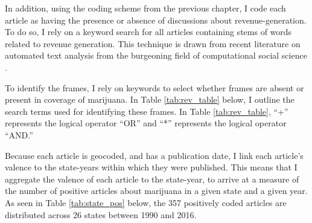 In addition, using the coding scheme from the previous chapter, I code each article as having the presence or absence of discussions about revenue-generation. To do so, I rely on a keyword search for all articles containing stems of words related to revenue generation. This technique is drawn from recent literature on automated text analysis from the burgeoning field of computational social science \citep{bail_2016,dimaggio_2015}. 

To identify the frames, I rely on keywords to select whether frames are absent or present in coverage of marijuana. In Table \ref{tab:rev_table} below, I outline the search terms used for identifying these frames. In Table \ref{tab:rev_table}, ``+'' represents the logical operator ``OR'' and ``*'' represents the logical operator ``AND.''




  


Because each article is geocoded, and has a publication date, I link each article's valence to the state-years within which they were published. This means that I aggregate the valence of each article to the state-year, to arrive at a measure of the number of positive articles about marijuana in a given state and a given year. As seen in Table \ref{tab:state_pos} below, the 357 positively coded articles are distributed across 26 states between 1990 and 2016.  






